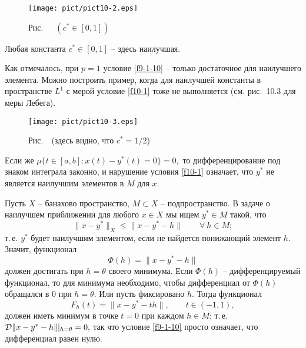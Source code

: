 \begin{figure}[ht]
\begin{center}
\texttt{[image: pict/pict10-2.eps]}
\end{center}
 \bigskip
 \label{r10-2}

 \centerline{Рис.~\theris\ \  $(c^*\in [0,1])$}
\end{figure}



 \noindent Любая константа $c^*\in [0,1]$ -- {здесь} наилучшая.

 Как отмечалось, при $p=1$ {условие} \eqref{f9-1-10} -- {только} достаточное для наилучшего
 элемента. Можно построить пример, когда для наилучшей
 константы в {пространстве $L^1$ с мерой} условие \eqref{f10-1} {тоже} не выполняется
 (см. рис.~10.3 для меры Лебега).

 \bigskip
\begin{figure}[ht]
\begin{center}
\texttt{[image: pict/pict10-3.eps]}
\end{center}
 \bigskip
 \label{r10-3}

 \centerline{Рис.~\theris\ (здесь видно, что $c^*=1/2$)}
 \bigskip
\end{figure}




 Если {же $\mu\{t\in[a,b] : x(t)-y^*(t)=0\}=0,$} то дифференцирование под знаком интеграла
 законно, и нарушение условия \eqref{f10-1} означает, что $y^*$ не является наилучшим
 элементов в $M$ для $x$.

 Пусть $X$ -- банахово пространство, $M\subset X $ --
 подпространство.
 В задаче о наилучшем приближении для любого $x\in X$
 мы ищем $y^*\in M$ такой, что
 $$
 \|x-y^*\|_X\le \|x-y^*-h\|\qquad \forall\  h\in M;
 $$
 т.\,е. $y^*$ будет наилучшим элементом, если  не найдется понижающий
 элемент $h.$ Значит, функционал
 $$
 \Phi(h)=\|x-y^*-h\|
 $$
 должен достигать при $h=\theta$ своего минимума. Если $\Phi(h)$ --
 дифференцируемый функционал, то для минимума необходимо, чтобы
 дифференциал от $\Phi(h)$ обращался в 0 при $h=\theta.$
 Или пусть фиксировано $h.$ Тогда функционал
 $$
 F_h(t)=\|x-y^*-th\|,\qquad t\in (-1,1),
 $$
 должен иметь минимум в точке $t=0$ при каждом $h\in M$; т.\,е. ${\cal D}\|x-y^*-h\|
 |_{h=\theta}=0,$ так что условие \eqref{f9-1-10} просто означает, что дифференциал равен
 нулю.

